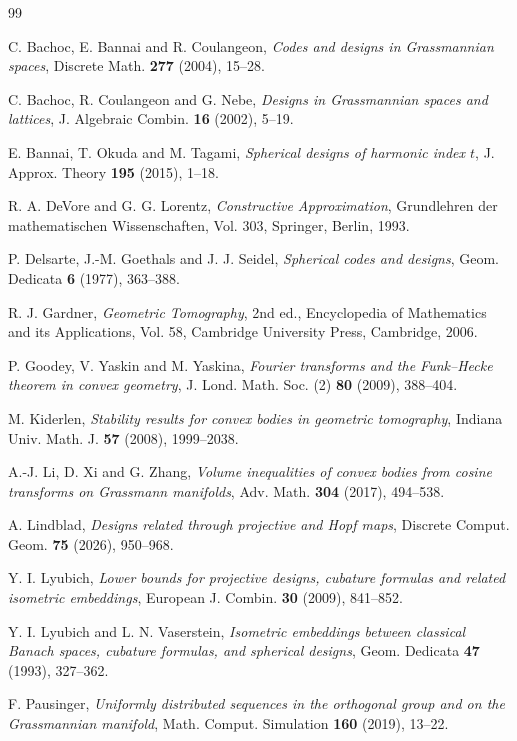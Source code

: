 \documentclass[12pt,a4paper]{article}
\theoremstyle{plain}
\theoremstyle{definition}
\begin{document}
\begin{thebibliography}{99}

C. Bachoc, E. Bannai and R. Coulangeon,
\emph{Codes and designs in Grassmannian spaces},
Discrete Math. \textbf{277} (2004), 15--28.

C. Bachoc, R. Coulangeon and G. Nebe,
\emph{Designs in Grassmannian spaces and lattices},
J. Algebraic Combin. \textbf{16} (2002), 5--19.

E. Bannai, T. Okuda and M. Tagami,
\emph{Spherical designs of harmonic index $t$},
J. Approx. Theory \textbf{195} (2015), 1--18.

R. A. DeVore and G. G. Lorentz,
\emph{Constructive Approximation},
Grundlehren der mathematischen Wissenschaften, Vol. 303,
Springer, Berlin, 1993.

P. Delsarte, J.-M. Goethals and J. J. Seidel,
\emph{Spherical codes and designs},
Geom. Dedicata \textbf{6} (1977), 363--388.

R. J. Gardner,
\emph{Geometric Tomography}, 2nd ed., Encyclopedia of Mathematics and its Applications, Vol. 58,
Cambridge University Press, Cambridge, 2006.

P. Goodey, V. Yaskin and M. Yaskina,
\emph{Fourier transforms and the Funk--Hecke theorem in convex geometry},
J. Lond. Math. Soc. (2) \textbf{80} (2009), 388--404.

M. Kiderlen,
\emph{Stability results for convex bodies in geometric tomography},
Indiana Univ. Math. J. \textbf{57} (2008), 1999--2038.

A.-J. Li, D. Xi and G. Zhang,
\emph{Volume inequalities of convex bodies from cosine transforms on Grassmann manifolds},
Adv. Math. \textbf{304} (2017), 494--538.

A. Lindblad,
\emph{Designs related through projective and Hopf maps},
Discrete Comput. Geom. \textbf{75} (2026), 950--968.

Y. I. Lyubich,
\emph{Lower bounds for projective designs, cubature formulas and related isometric embeddings},
European J. Combin. \textbf{30} (2009), 841--852.

Y. I. Lyubich and L. N. Vaserstein,
\emph{Isometric embeddings between classical Banach spaces, cubature formulas, and spherical designs},
Geom. Dedicata \textbf{47} (1993), 327--362.

F. Pausinger,
\emph{Uniformly distributed sequences in the orthogonal group and on the Grassmannian manifold},
Math. Comput. Simulation \textbf{160} (2019), 13--22.


\end{thebibliography}
\end{document}
